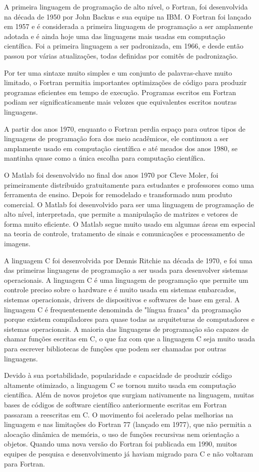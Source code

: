 A primeira linguagem de programação de alto nível, o Fortran, foi desenvolvida na década de 1950 por John Backus e sua equipe na IBM. O Fortran foi lançado em 1957 e é considerada a primeira linguagem de programação a ser amplamente adotada e é ainda hoje uma das linguagens mais usadas em computação científica. Foi a primeira linguagem a ser padronizada, em 1966, e desde então passou por várias atualizações, todas definidas por comitês de padronização.


Por ter uma sintaxe muito simples e um conjunto de palavras-chave muito limitado, o Fortran permitia importantes optimizações de código para produzir programas eficientes em tempo de execução. Programas escritos em Fortran podiam ser significaticamente mais velozes que equivalentes escritos noutras linguagens.

A partir dos anos 1970, enquanto o Fortran perdia espaço para outros tipos de linguagens de programação fora dos meio acadêmicos, ele continuou a ser amplamente usado em computação científica e até meados dos anos 1980, se mantinha quase como a única escolha para computação científica. 

O Matlab foi desenvolvido no final dos anos 1970 por Cleve Moler, foi primeiramente distribuido gratuitamente para estudantes e professores como uma ferramenta de ensino. Depois for remodelado e transformado num produto comercial. O Matlab foi desenvolvido para ser uma linguagem de programação de alto nível, interpretada, que permite a manipulação de matrizes e vetores de forma muito eficiente. O Matlab segue muito usado em algumas áreas em especial na teoria de controle, tratamento de sinais e comunicações e processamento de imagens.

A linguagem C foi desenvolvida por Dennis Ritchie na década de 1970, e foi uma das primeiras linguagens de programação a ser usada para desenvolver sistemas operacionais. A linguagem C é uma linguagem de programação que permite um controle preciso sobre o hardware e é muito usada em sistemas embarcados, sistemas operacionais, drivers de dispositivos e softwares de base em geral. A linguagem C é frequentemente denominda de "língua franca" da programação porque existem compiladores para quase todas as arquiteturas de computadores e sistemas operacionais. A maioria das linguagens de programação são capazes de chamar funções escritas em C, o que faz com que a linguagem C seja muito usada para escrever bibliotecas de funções que podem ser chamadas por outras linguagens. 

Devido à sua portabilidade, popularidade e capacidade de produzir código altamente otimizado, a linguagem C se tornou muito usada em computação científica. Além de novos projetos que surgiam nativamente na linguagem, muitas bases de códigos de software científico anteriormente escritas em Fortran passaram a reescritas em C. O movimento foi acelerado pelas melhorias na linguagem e nas limitações do Fortran 77 (lançado em 1977), que não permitia a alocação dinâmica de memória, o uso de funções recursivas nem orientação a objetos. Quando uma nova versão do Fortran foi publicada em 1990, muitos equipes de pesquisa e desenvolvimento já haviam migrado para C e não voltaram para Fortran.

